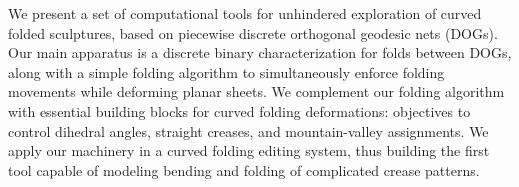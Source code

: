 We present a set of computational tools for unhindered exploration of curved folded sculptures, based on piecewise discrete orthogonal geodesic nets (DOGs). Our main apparatus is a discrete binary characterization for folds between DOGs, along with a simple folding algorithm to simultaneously enforce folding movements while deforming planar sheets. We complement our folding algorithm with essential building blocks for curved folding deformations: objectives to control dihedral angles, straight creases, and mountain-valley assignments. We apply our machinery in a curved folding editing system, thus building the first tool capable of modeling bending and folding of complicated crease patterns.

